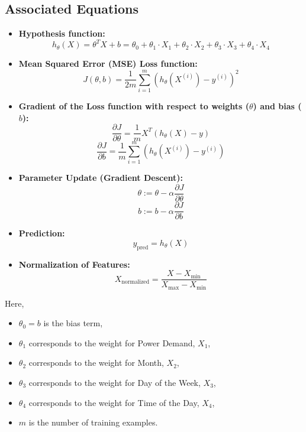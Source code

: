 \documentclass[a4paper,12pt,oneside]{book}
\begin{document}
\subsection{Associated Equations}
\begin{itemize}
\item \textbf{Hypothesis function:}
\begin{equation}
h_{\theta}(X) = \theta^T X + b = \theta_0 + \theta_1 \cdot X_1 + \theta_2 \cdot X_2 + \theta_3 \cdot X_3 + \theta_4 \cdot X_4
\end{equation}

\item \textbf{Mean Squared Error (MSE) Loss function:}
\begin{equation}
J(\theta, b) = \frac{1}{2m} \sum_{i=1}^{m} (h_{\theta}(X^{(i)}) - y^{(i)})^2
\end{equation}

\item \textbf{Gradient of the Loss function with respect to weights ($\theta$) and bias ($b$):}
\begin{equation}
\frac{\partial J}{\partial \theta} = \frac{1}{m} X^T(h_{\theta}(X) - y)
\end{equation}
\begin{equation}
\frac{\partial J}{\partial b} = \frac{1}{m} \sum_{i=1}^{m} (h_{\theta}(X^{(i)}) - y^{(i)})
\end{equation}

\item \textbf{Parameter Update (Gradient Descent):}
\begin{equation}
\theta := \theta - \alpha \frac{\partial J}{\partial \theta}
\end{equation}
\begin{equation}
b := b - \alpha \frac{\partial J}{\partial b}
\end{equation}

\item \textbf{Prediction:}
\begin{equation}
y_{\text{pred}} = h_{\theta}(X)
\end{equation}

\item \textbf{Normalization of Features:}
\begin{equation}
X_{\text{normalized}} = \frac{X - X_{\text{min}}}{X_{\text{max}} - X_{\text{min}}}
\end{equation}
\end{itemize}

Here,
\begin{itemize}
\item $\theta_0 = b$ is the bias term,
\item $\theta_1$ corresponds to the weight for Power Demand, $X_1$,
\item $\theta_2$ corresponds to the weight for Month, $X_2$,
\item $\theta_3$ corresponds to the weight for Day of the Week, $X_3$,
\item $\theta_4$ corresponds to the weight for Time of the Day, $X_4$,
\item $m$ is the number of training examples.
\end{itemize}
\end{document}
